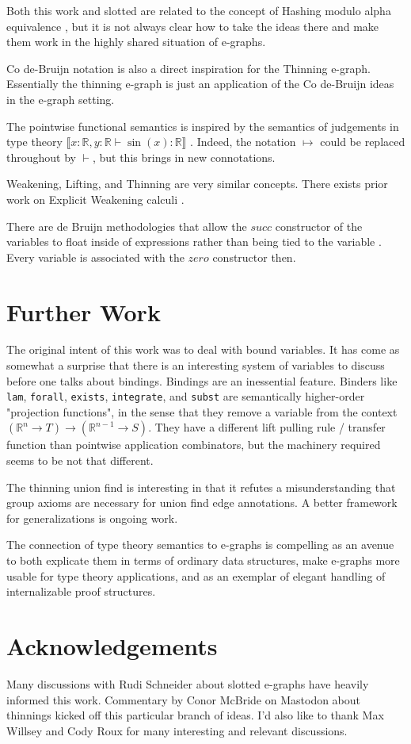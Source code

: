 \documentclass{article}%
\newcommand{\bR}{\mathbb{R}}
\begin{document}
Both this work and slotted are related to the concept of Hashing modulo alpha equivalence \cite{hashalpha}, but it is not always clear how to take the ideas there and make them work in the highly shared situation of e-graphs.

Co de-Bruijn notation \cite{McBride_2018} is also a direct inspiration for the Thinning e-graph. Essentially the thinning e-graph is just an application of the Co de-Bruijn ideas in the e-graph setting.

The pointwise functional semantics is inspired by the semantics of judgements in type theory $\llbracket x : \mathbb{R}, y : \mathbb{R} \vdash \sin(x) : \mathbb{R} \rrbracket$ \cite{Hofmann_1997}. Indeed, the notation $\mapsto$ could be replaced throughout by $\vdash$, but this brings in new connotations. 

Weakening, Lifting, and Thinning are very similar concepts. There exists prior work on Explicit Weakening calculi \cite{Wadler_2024}\cite{DAVID_GUILLAUME_2001}.

There are de Bruijn methodologies that allow the $succ$ constructor of the variables to float inside of expressions rather than being tied to the variable \cite{kiselyov}\cite{pavel}. Every variable is associated with the $zero$ constructor then.

\section{Further Work}

The original intent of this work was to deal with bound variables. It has come as somewhat a surprise that there is an interesting system of variables to discuss before one talks about bindings. Bindings are an inessential feature. Binders like \lstinline|lam|, \lstinline|forall|, \lstinline|exists|, \lstinline|integrate|, and \lstinline|subst| are semantically higher-order "projection functions", in the sense that they remove a variable from the context $(\bR^n \rightarrow T) \rightarrow (\bR^{n-1} \rightarrow S)$. They have a different lift pulling rule / transfer function than pointwise application combinators, but the machinery required seems to be not that different.

The thinning union find is interesting in that it refutes a misunderstanding that group axioms are necessary for union find edge annotations. A better framework for generalizations is ongoing work.

The connection of type theory semantics to e-graphs is compelling as an avenue to both explicate them in terms of ordinary data structures, make e-graphs more usable for type theory applications, and as an exemplar of elegant handling of internalizable proof structures.

\section{Acknowledgements}
Many discussions with Rudi Schneider about slotted e-graphs have heavily informed this work. Commentary by Conor McBride on Mastodon about thinnings kicked off this particular branch of ideas. I'd also like to thank Max Willsey and Cody Roux for many interesting and relevant discussions.


\end{document}
